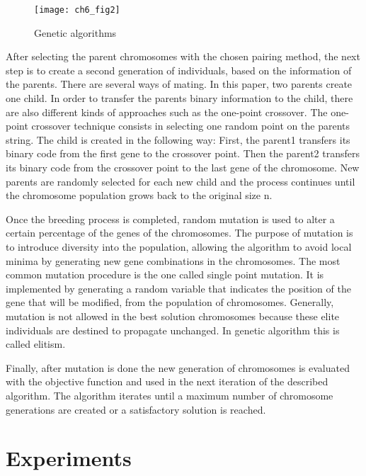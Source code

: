 \begin{figure}[t]
  \centering
  \texttt{[image: ch6\_fig2]}  
  \caption{Genetic algorithms \citep{Haupt2004}}
  \label{fig:6:geneticalgorithms}
\end{figure}
  
After selecting the parent chromosomes with the chosen pairing method, the next step is to create a 
second generation of individuals, based on the information of the parents. There are several ways of 
mating. In this paper, two parents create one child. 
In order to transfer the parents binary information to the child, there are also different kinds 
of approaches such as the one-point crossover. The one-point crossover technique consists in 
selecting one random point on the parents string. The child is created in the following way: First, 
the parent1 transfers its binary code from the first gene to the crossover point. Then the parent2 
transfers its binary code from the crossover point to the last gene of the chromosome. New parents 
are randomly selected for each new child and the process continues until the chromosome population 
grows back to the original size n. 

Once the breeding process is completed, random mutation is used to alter a certain percentage of the 
genes of the chromosomes. The purpose of mutation is to introduce diversity into the population, 
allowing the algorithm to avoid local minima by generating new gene combinations in the chromosomes. 
The most common mutation procedure is the one called single point mutation. It is implemented by 
generating a random variable that indicates the position of the gene that will be modified, from the 
population of chromosomes. Generally, mutation is not allowed in the best solution chromosomes 
because these elite individuals are destined to propagate unchanged. In genetic algorithm this 
is called elitism.

Finally, after mutation is done the new generation of chromosomes is evaluated with the objective 
function and used in the next iteration of the described algorithm.
The algorithm iterates until a maximum number of chromosome generations are created or a 
satisfactory solution is reached.


\section{Experiments}
\label{sec:6:results}